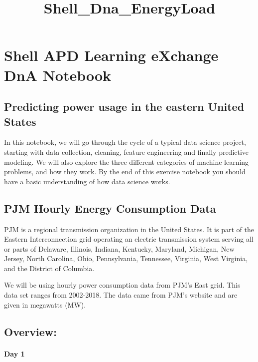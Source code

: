 \documentclass[11pt]{article}
\title{Shell\_Dna\_EnergyLoad}
\begin{document}
    
    
    \maketitle
    
    

    
    \section{Shell APD Learning eXchange DnA
Notebook}\label{shell-apd-learning-exchange-dna-notebook}

\subsection{Predicting power usage in the eastern United
States}\label{predicting-power-usage-in-the-eastern-united-states}

In this notebook, we will go through the cycle of a typical data science
project, starting with data collection, cleaning, feature engineering
and finally predictive modeling. We will also explore the three
different categories of machine learning problems, and how they work. By
the end of this exercise notebook you should have a basic understanding
of how data science works.

    \subsection{PJM Hourly Energy Consumption
Data}\label{pjm-hourly-energy-consumption-data}

PJM is a regional transmission organization in the United States. It is
part of the Eastern Interconnection grid operating an electric
transmission system serving all or parts of Delaware, Illinois, Indiana,
Kentucky, Maryland, Michigan, New Jersey, North Carolina, Ohio,
Pennsylvania, Tennessee, Virginia, West Virginia, and the District of
Columbia.

We will be using hourly power consumption data from PJM's East grid.
This data set ranges from 2002-2018. The data came from PJM's website
and are given in megawatts (MW).

    \subsection{Overview:}\label{overview}

\paragraph{Day 1}\label{day-1}
\end{document}
